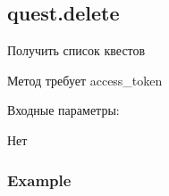 \subsection{quest.delete}
Получить список квестов

Метод требует access\_token

Входные параметры:
\begin{itemize}
  Нет
\end{itemize}

\subsubsection{Example}
\begin{Verbatim}[frame=single]

\end{Verbatim}